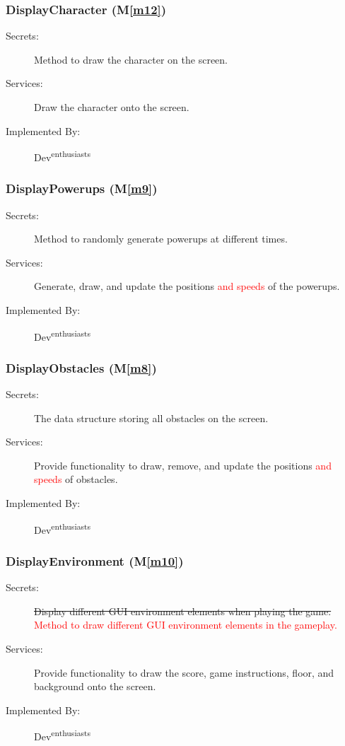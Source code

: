 \documentclass[12pt, titlepage]{article}
\newcommand{\mref}[1]{M\ref{#1}}
\begin{document}
\subsubsection{DisplayCharacter (\mref{m12})}
\begin{description}
\item[Secrets:] Method to draw the character on the screen.
\item[Services:] Draw the character onto the screen.
\item[Implemented By:] Dev\textsuperscript{enthusiasts}
\end{description}

\subsubsection{DisplayPowerups (\mref{m9})}
\begin{description}
\item[Secrets:]  Method to randomly generate powerups at different times. 
\item[Services:] Generate, draw, and update the positions \textcolor{red}{and speeds} of the powerups.
\item[Implemented By:] Dev\textsuperscript{enthusiasts}
\end{description}

\subsubsection{DisplayObstacles (\mref{m8})}
\begin{description}
\item[Secrets:] The data structure storing all obstacles on the screen.
\item[Services:] Provide functionality to draw, remove, and update the positions \textcolor{red}{and speeds} of obstacles.
\item[Implemented By:] Dev\textsuperscript{enthusiasts}
\end{description}

\subsubsection{DisplayEnvironment (\mref{m10})}
\begin{description}
\item[Secrets:] \sout{Display different GUI environment elements when playing the game.} \textcolor{red}{Method to draw different GUI environment elements in the gameplay.}
\item[Services:] Provide functionality to draw the score, game instructions, floor, and background onto the screen.
\item[Implemented By:] Dev\textsuperscript{enthusiasts}
\end{description}
\end{document}
